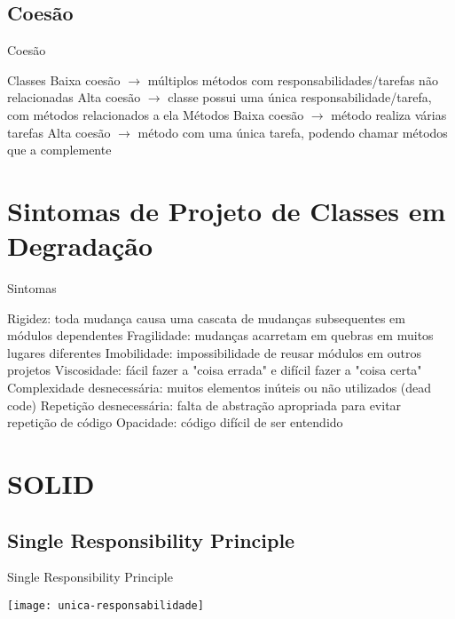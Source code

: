 \documentclass{beamer}
\begin{document}
\subsection{Coesão} %

\begin{frame}{Coesão}
 \begin{outline}
   Classes
     Baixa coesão $\rightarrow$ múltiplos métodos com responsabilidades/tarefas não relacionadas
     Alta coesão $\rightarrow$ classe possui uma única responsabilidade/tarefa, com métodos relacionados a ela
   Métodos
     Baixa coesão $\rightarrow$ método realiza várias tarefas
     Alta coesão $\rightarrow$ método com uma única tarefa, podendo chamar métodos que a complemente
 \end{outline}
\end{frame}

\section{Sintomas de Projeto de Classes em Degradação}

\begin{frame}{Sintomas}
 \begin{outline}
   Rigidez: toda mudança causa uma cascata de mudanças subsequentes em módulos dependentes
   Fragilidade: mudanças acarretam em quebras em muitos lugares diferentes
   Imobilidade: impossibilidade de reusar módulos em outros projetos
   Viscosidade: fácil fazer a "coisa errada" e difícil fazer a "coisa certa"
   Complexidade desnecessária: muitos elementos inúteis ou não utilizados (dead code)
   Repetição desnecessária: falta de abstração apropriada para evitar repetição de código
   Opacidade: código difícil de ser entendido
 \end{outline}
\end{frame}


\section{SOLID}

\subsection{Single Responsibility Principle}

\begin{frame}{Single Responsibility Principle}
  \begin{center}
    \texttt{[image: unica-responsabilidade]}
  \end{center}
\end{frame}
\end{document}
